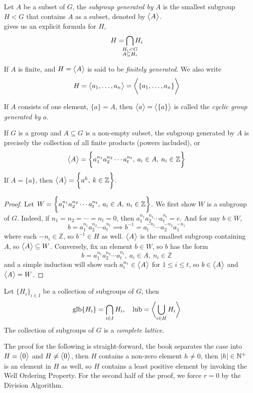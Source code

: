 \documentclass[../main-manifolds.tex]{subfiles}
\begin{document}
\begin{definition}\label{hungerford-chp1:subgroup-generated-definition}
    Let $A$ be a subset of $G$, the \emph{subgroup generated by $A$} is the smallest subgroup $H<G$ that contains $A$ as a subset, denoted by $\abrackets{A}$.\\

     gives us an explicit formula for $H$,
    \[
        H = \bigcap_{\mathclap{\substack{H_i<G\\ A\subseteq H_i}}}H_i
    \]

    If $A$ is finite, and $H=\abrackets{A}$ is said to be \emph{finitely generated}. We also write 
    \[
        H = \abrackets{a_1,\ldots,a_n}=\abrackets[\bigg]{\{a_1,\ldots,a_n\}}
    \]
    
    If $A$ consists of one element, $\{a\}=A$, then $\abrackets{a}=\abrackets{\{a\}}$ is called the \emph{cyclic group generated by $a$}.
\end{definition}
\begin{wts}\label{hungerford-chp1:theorem2.8}
    If $G$ is a group and $A\subseteq G$ is a non-empty subset, the subgroup generated by $A$ is precisely the collection of all finite products (powers included), or
    \[
        \abrackets{A}=\bigset{a_1^{n_1}a_2^{n_2}\cdots a_t^{n_t},\: a_{i}\in A,\: n_i\in\mathbb{Z}}
    \]
    If $A=\{a\}$, then $\abrackets{A}=\bigset{a^k,\: k\in \mathbb{Z}}$.
\end{wts}
\begin{proof}
    Let $W=\bigset{a_1^{n_1}a_2^{n_2}\cdots a_t^{n_t},\: a_{i}\in A,\: n_i\in\mathbb{Z}}$. We first show $W$ is a subgroup of $G$. Indeed, if $n_1=n_2=\cdots=n_t=0$, then $a_1^{n_1}a_2^{n_2}\cdots a_t^{n_t}=e$. And for any $b\in W$, 
    \[
        b = a_1^{n_1}a_2^{n_2}\cdots a_t^{n_t}\implies b^{-1}=a_t^{-n_t}\cdots a_2^{-n_2}a_1^{-n_1}
    \]
    where each $-n_i\in \mathbb{Z}$, so $b^{-1}\in H$ as well. $\abrackets{A}$ is the smallest subgroup containing $A$, so $\abrackets{A}\subseteq W$. Conversely, fix an element $b\in W$, so $b$ has the form
    \[
        b = a_1^{n_1}a_2^{n_2}\cdots a_t^{n_t},\: a_i\in A,\: n_i\in \mathbb{Z}
    \]
    and a simple induction will show each $a_i^{n_i}\in \abrackets{A}$ for $1\leq i\leq t$, so $b\in \abrackets{A}$ and $\abrackets{A}=W$.
\end{proof}

\begin{definition}\label{hungerford-chp1:subgroup-lattice}
    Let $\{H_i\}_{i\in I}$ be a collection of subgroups of $G$, then 
    \[
        \glb\{H_i\}=\bigcap_{i\in I}H_i,\quad \lub=\abrackets[\bigg]{\bigcup_{i\in H}H_i}
    \]
    The collection of subgroups of $G$ is a \emph{complete lattice}.
\end{definition}
The proof for the following is straight-forward, the book separates the case into $H=\abrackets{0}$ and $H\neq\abrackets{0}$, then $H$ contains a non-zero element $h\neq 0$, then $|h|\in \nat^+$ is an element in $H$ as well, so $H$ contains a least positive element by invoking the Well Ordering Property. For the second half of the proof, we force $r=0$ by the Division Algorithm.
\end{document}
